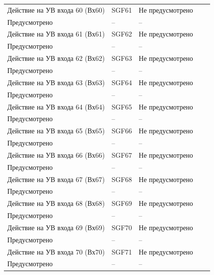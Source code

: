 \begin{longtable}{|>{\centering\arraybackslash}m{5.3cm}|>{\centering\arraybackslash}m{3.3cm}|>{\centering\arraybackslash}m{4.2cm}|>{\centering\arraybackslash}m{1.8cm}|>{\centering\arraybackslash}m{1cm}|}
\hline
\centering Действие на УВ входа 60 (Вх60)  & \centering SGF61 & \centering Не предусмотрено \\ Предусмотрено & \centering -- & \centering \arraybackslash -- \\
\hline
\centering Действие на УВ входа 61 (Вх61)  & \centering SGF62 & \centering Не предусмотрено \\ Предусмотрено & \centering -- & \centering \arraybackslash -- \\
\hline
\centering Действие на УВ входа 62 (Вх62)  & \centering SGF63 & \centering Не предусмотрено \\ Предусмотрено & \centering -- & \centering \arraybackslash -- \\
\hline
\centering Действие на УВ входа 63 (Вх63)  & \centering SGF64 & \centering Не предусмотрено \\ Предусмотрено & \centering -- & \centering \arraybackslash -- \\
\hline
\centering Действие на УВ входа 64 (Вх64)  & \centering SGF65 & \centering Не предусмотрено \\ Предусмотрено & \centering -- & \centering \arraybackslash -- \\
\hline
\centering Действие на УВ входа 65 (Вх65)  & \centering SGF66 & \centering Не предусмотрено \\ Предусмотрено & \centering -- & \centering \arraybackslash -- \\
\hline
\centering Действие на УВ входа 66 (Вх66)  & \centering SGF67 & \centering Не предусмотрено \\ Предусмотрено & \centering -- & \centering \arraybackslash -- \\
\hline
\centering Действие на УВ входа 67 (Вх67)  & \centering SGF68 & \centering Не предусмотрено \\ Предусмотрено & \centering -- & \centering \arraybackslash -- \\
\hline
\centering Действие на УВ входа 68 (Вх68)  & \centering SGF69 & \centering Не предусмотрено \\ Предусмотрено & \centering -- & \centering \arraybackslash -- \\
\hline
\centering Действие на УВ входа 69 (Вх69)  & \centering SGF70 & \centering Не предусмотрено \\ Предусмотрено & \centering -- & \centering \arraybackslash -- \\
\hline
\centering Действие на УВ входа 70 (Вх70)  & \centering SGF71 & \centering Не предусмотрено \\ Предусмотрено & \centering -- & \centering \arraybackslash -- \\

\end{longtable}
